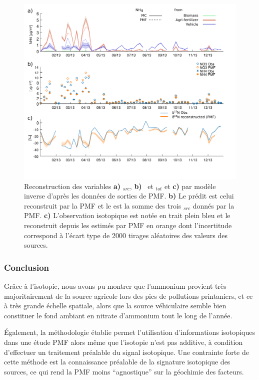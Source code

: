 \begin{figure}[ht]
    \centering
    \includegraphics[width=1.0\textwidth]{figures/INACS/PMF_OPE_reconstruction.pdf}
    \caption{Reconstruction des variables \textbf{a)} \NHq$_{src}$, \textbf{b)} \NOt~et
        \NHq$_{tot}$ et \textbf{c)} \dN{} par modèle inverse d'après les données de sorties
        de PMF.
        \textbf{b)} Le \NOt{} prédit est celui reconstruit par la PMF et le \NHq{} est la
        somme des trois \NHq$_{src}$ donnés par la PMF.
        \textbf{c)} L'observation isotopique \dN{} est notée en trait plein bleu et le
        \dN{} reconstruit depuis les \NHq{} estimés par PMF en orange dont l'incertitude
        correspond à l'écart type de 2000 tirages aléatoires des valeurs des sources.
    }
    \label{fig:PMFreconstruct}
\end{figure}

\subsubsection{Conclusion}%
\label{ssub:conclusion_isotopie}


Grâce à l'isotopie, nous avons pu montrer que l'ammonium provient très majoritairement
de la source agricole lors des pics de pollutions printaniers, et ce à très grande échelle
spatiale, alors que la source véhiculaire semble bien constituer le fond ambiant en
nitrate d'ammonium tout le long de l'année.

Également, la méthodologie établie permet l'utilisation d'informations isotopiques dans
une étude PMF alors même que l'isotopie n'est pas additive, à condition d'effectuer un
traitement préalable du signal isotopique. Une contrainte forte de cette méthode est la
connaissance préalable de la signature isotopique des sources, ce qui rend la PMF moins
``agnostique'' sur la géochimie des facteurs.

